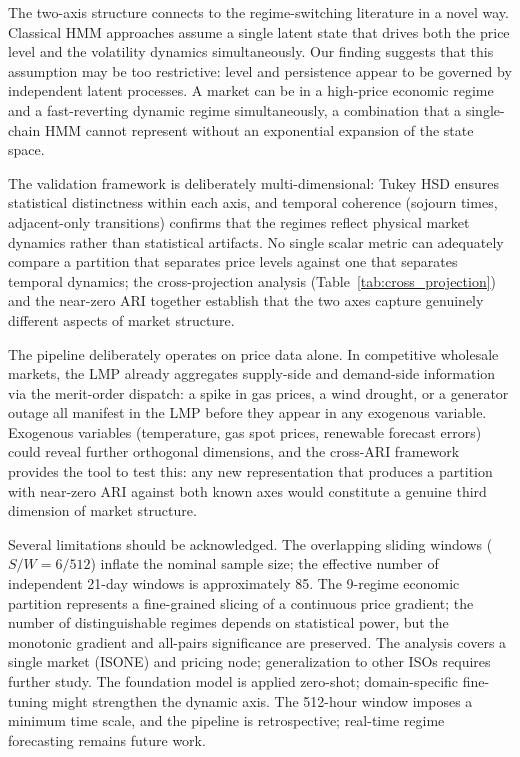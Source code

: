 \documentclass[12pt]{article}
\begin{document}

The two-axis structure connects to the regime-switching literature in a novel way.
Classical HMM approaches assume a single latent state that drives both the price level and the volatility dynamics simultaneously.
Our finding suggests that this assumption may be too restrictive: level and persistence appear to be governed by independent latent processes.
A market can be in a high-price economic regime and a fast-reverting dynamic regime simultaneously, a combination that a single-chain HMM cannot represent without an exponential expansion of the state space.


The validation framework is deliberately multi-dimensional: Tukey HSD ensures statistical distinctness within each axis, and temporal coherence (sojourn times, adjacent-only transitions) confirms that the regimes reflect physical market dynamics rather than statistical artifacts.
No single scalar metric can adequately compare a partition that separates price levels against one that separates temporal dynamics; the cross-projection analysis (Table~\ref{tab:cross_projection}) and the near-zero ARI together establish that the two axes capture genuinely different aspects of market structure.


The pipeline deliberately operates on price data alone.
In competitive wholesale markets, the LMP already aggregates supply-side and demand-side information via the merit-order dispatch: a spike in gas prices, a wind drought, or a generator outage all manifest in the LMP before they appear in any exogenous variable.
Exogenous variables (temperature, gas spot prices, renewable forecast errors) could reveal further orthogonal dimensions, and the cross-ARI framework provides the tool to test this: any new representation that produces a partition with near-zero ARI against both known axes would constitute a genuine third dimension of market structure.


Several limitations should be acknowledged.
The overlapping sliding windows ($S/W = 6/512$) inflate the nominal sample size; the effective number of independent 21-day windows is approximately 85.
The 9-regime economic partition represents a fine-grained slicing of a continuous price gradient; the number of distinguishable regimes depends on statistical power, but the monotonic gradient and all-pairs significance are preserved.
The analysis covers a single market (ISONE) and pricing node; generalization to other ISOs requires further study.
The foundation model is applied zero-shot; domain-specific fine-tuning might strengthen the dynamic axis.
The 512-hour window imposes a minimum time scale, and the pipeline is retrospective; real-time regime forecasting remains future work.
\end{document}

